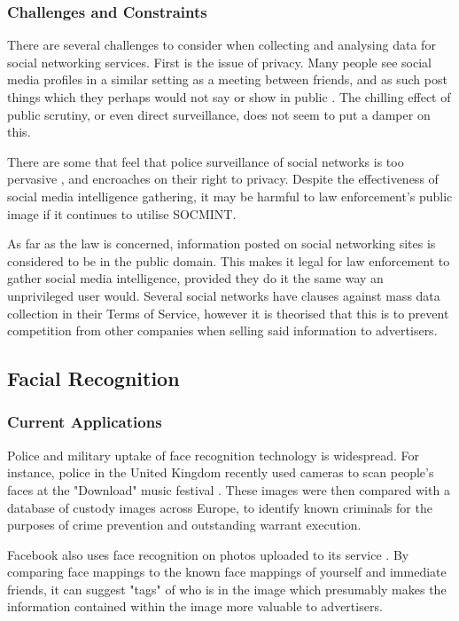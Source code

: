 \documentclass[12pt]{article}
\begin{document}
\subsubsection{Challenges and Constraints}
There are several challenges to consider when collecting and analysing data for social networking services. First is the issue of privacy. Many people see social media profiles in a similar setting as a meeting between friends, and as such post things which they perhaps would not say or show in public \citep{socialmediacontent}. The chilling effect of public scrutiny, or even direct surveillance, does not seem to put a damper on this.

There are some that feel that police surveillance of social networks is too pervasive \citep{socmintlawenforcement}, and encroaches on their right to privacy. Despite the effectiveness of social media intelligence gathering, it may be harmful to law enforcement's public image if it continues to utilise SOCMINT.

As far as the law is concerned, information posted on social networking sites is considered to be in the public domain. This makes it legal for law enforcement to gather social media intelligence, provided they do it the same way an unprivileged user would. Several social networks have clauses against mass data collection in their Terms of Service, however it is theorised that this is to prevent competition from other companies when selling said information to advertisers.

\subsection{Facial Recognition}
\subsubsection{Current Applications}
Police and military uptake of face recognition technology is widespread. For instance, police in the United Kingdom recently used cameras to scan people's faces at the "Download" music festival \citep{policefacerecog}. These images were then compared with a database of custody images across Europe, to identify known criminals for the purposes of crime prevention and outstanding warrant execution.

Facebook also uses face recognition on photos uploaded to its service \citep{facebookfacerecog}. By comparing face mappings to the known face mappings of yourself and immediate friends, it can suggest "tags" of who is in the image which presumably makes the information contained within the image more valuable to advertisers.
\end{document}
